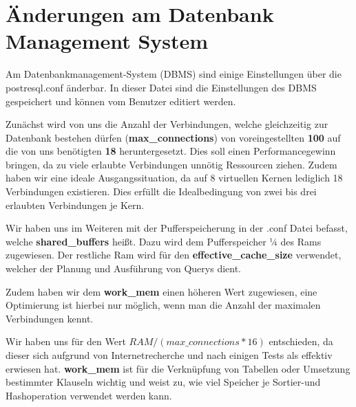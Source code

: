 \section{Änderungen am Datenbank Management System}

Am Datenbankmanagement-System (DBMS) sind einige Einstellungen über die
postresql.conf änderbar. In dieser Datei sind die Einstellungen des DBMS
gespeichert und können vom Benutzer editiert werden.

Zunächst wird von uns die Anzahl der Verbindungen, welche gleichzeitig zur
Datenbank bestehen dürfen (\textbf{max\_connections}) von voreingestellten
\textbf{100} auf die von uns benötigten \textbf{18} heruntergesetzt. 
Dies soll einen Performancegewinn bringen, da zu viele erlaubte Verbindungen
unnötig Ressourcen ziehen. Zudem haben wir eine ideale Ausgangssituation, da auf
8 virtuellen Kernen lediglich 18 Verbindungen existieren. Dies erfüllt die
Idealbedingung von zwei bis drei erlaubten Verbindungen je Kern.

Wir haben uns im Weiteren mit der Pufferspeicherung in der .conf Datei befasst,
welche \textbf{shared\_buffers} heißt. Dazu wird dem Pufferspeicher ¼ des Rams
zugewiesen. Der restliche Ram wird für den \textbf{effective\_cache\_size}
verwendet, welcher der Planung und Ausführung von Querys dient.

Zudem haben wir dem \textbf{work\_mem} einen höheren Wert zugewiesen, eine
Optimierung ist hierbei nur möglich, wenn man die Anzahl der maximalen Verbindungen kennt.


Wir haben uns für den Wert $RAM/(max\_connections * 16)$ entschieden, da
dieser sich aufgrund von Internetrecherche und nach einigen Tests als effektiv
erwiesen hat. \textbf{work\_mem }ist für die Verknüpfung von Tabellen oder
Umsetzung bestimmter Klauseln wichtig und weist zu, wie viel Speicher je Sortier-und
Hashoperation verwendet werden kann.

\clearpage